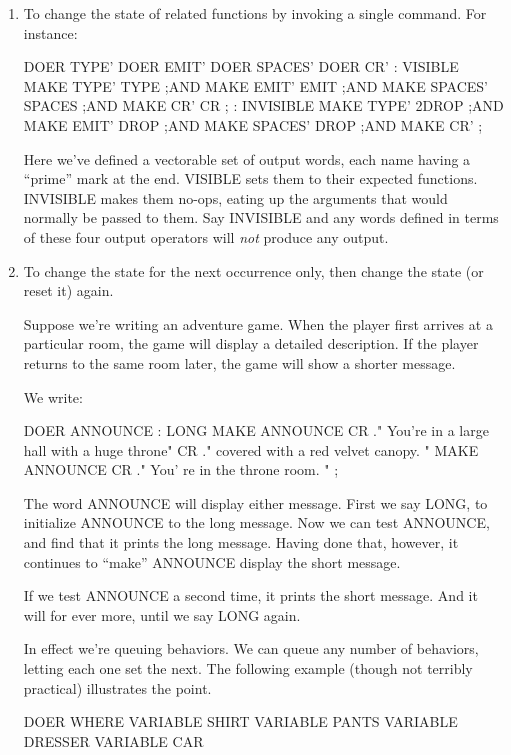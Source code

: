 \begin{enumerate}
\item To change the state of related functions by invoking a single command. For
instance:

\begin{Code}
DOER TYPE'
DOER EMIT'
DOER SPACES'
DOER CR'
: VISIBLE     MAKE TYPE'  TYPE ;AND
              MAKE EMIT'  EMIT ;AND
              MAKE SPACES'  SPACES ;AND
              MAKE CR'  CR ;
: INVISIBLE   MAKE TYPE'  2DROP ;AND
              MAKE EMIT'  DROP ;AND
              MAKE SPACES'  DROP ;AND
              MAKE CR'  ;
\end{Code}
Here we've defined a vectorable set of output words, each name having a
``prime'' mark at the end. VISIBLE sets them to their expected functions.
INVISIBLE makes them no-ops, eating up the arguments that would normally
be passed to them. Say INVISIBLE and any words defined in terms
of these four output operators will \emph{not} produce any output.

\item To change the state for the next occurrence only, then change the state (or
reset it) again.

Suppose we're writing an adventure game. When the player first arrives at
a particular room, the game will display a detailed description. If the player
returns to the same room later, the game will show a shorter message.

We write:

\begin{Code}
DOER ANNOUNCE
: LONG MAKE ANNOUNCE
   CR ." You're in a large hall with a huge throne"
   CR  ." covered with a red velvet canopy. "
         MAKE ANNOUNCE
   CR ." You' re in the throne room. " ;
\end{Code}
The word ANNOUNCE will display either message. First we say LONG, to
initialize ANNOUNCE to the long message. Now we can test ANNOUNCE,
and find that it prints the long message. Having done that,
however, it continues to ``make'' ANNOUNCE display the short message.

If we test ANNOUNCE a second time, it prints the short message. And it
will for ever more, until we say LONG again.

In effect we're queuing behaviors. We can queue any number of behaviors,
letting each one set the next. The following example (though not terribly
practical) illustrates the point.

\begin{Code}
DOER WHERE
VARIABLE SHIRT
VARIABLE PANTS
VARIABLE DRESSER
VARIABLE CAR


\end{Code}
\end{enumerate}
